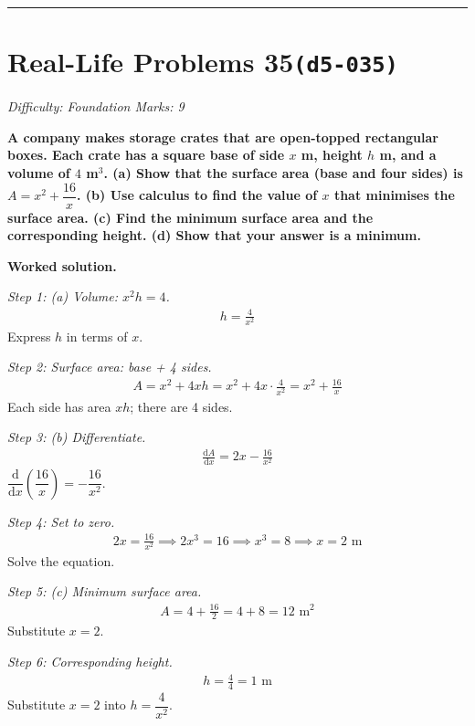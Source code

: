 \documentclass[11pt]{article}
\newcommand{\question}[1]{\par\medskip\noindent\textbf{#1}\par}
\begin{document}
\medskip\hrule

\section*{Real-Life Problems 35\quad\small\texttt{(d5-035)}}
\textit{Difficulty: Foundation \quad\textbar\quad Marks: 9}

\question{A company makes storage crates that are open-topped rectangular boxes. Each crate has a square base of side \( x \) m, height \( h \) m, and a volume of \( 4 \) m\(^3\). (a) Show that the surface area (base and four sides) is \( A = x^2 + \dfrac{16}{x} \). (b) Use calculus to find the value of \( x \) that minimises the surface area. (c) Find the minimum surface area and the corresponding height. (d) Show that your answer is a minimum.}

\textbf{Worked solution.}

\textit{Step 1: (a) Volume: \( x^2 h = 4 \).}
\[\begin{gathered}
h = \frac{4}{x^2}
\end{gathered}\]
Express \( h \) in terms of \( x \).

\textit{Step 2: Surface area: base + 4 sides.}
\[\begin{gathered}
A = x^2 + 4xh = x^2 + 4x \cdot \frac{4}{x^2} = x^2 + \frac{16}{x}
\end{gathered}\]
Each side has area \( xh \); there are 4 sides.

\textit{Step 3: (b) Differentiate.}
\[\begin{gathered}
\frac{\mathrm{d}A}{\mathrm{d}x} = 2x - \frac{16}{x^2}
\end{gathered}\]
\( \dfrac{\mathrm{d}}{\mathrm{d}x}\left(\dfrac{16}{x}\right) = -\dfrac{16}{x^2} \).

\textit{Step 4: Set to zero.}
\[\begin{gathered}
2x = \frac{16}{x^2} \implies 2x^3 = 16 \implies x^3 = 8 \implies x = 2 \text{ m}
\end{gathered}\]
Solve the equation.

\textit{Step 5: (c) Minimum surface area.}
\[\begin{gathered}
A = 4 + \frac{16}{2} = 4 + 8 = 12 \text{ m}^2
\end{gathered}\]
Substitute \( x = 2 \).

\textit{Step 6: Corresponding height.}
\[\begin{gathered}
h = \frac{4}{4} = 1 \text{ m}
\end{gathered}\]
Substitute \( x = 2 \) into \( h = \dfrac{4}{x^2} \).
\end{document}
